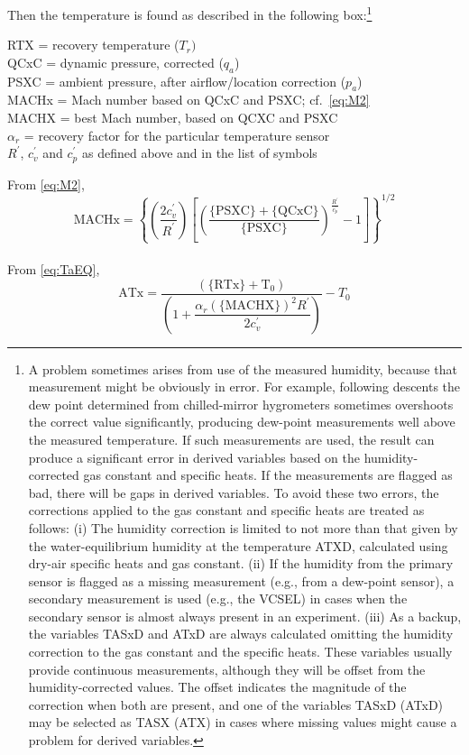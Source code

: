 \documentclass[
]{book}
\begin{document}
Then the temperature is found as described in the following box:\footnote{A problem sometimes arises from use of the measured humidity, because that measurement might be obviously in error. For example, following descents the dew point determined from chilled-mirror hygrometers sometimes overshoots the correct value significantly, producing dew-point measurements well above the measured temperature. If such measurements are used, the result can produce a significant error in derived variables based on the humidity-corrected gas constant and specific heats. If the measurements are flagged as bad, there will be gaps in derived variables. To avoid these two errors, the corrections applied to the gas constant and specific heats are treated as follows: (i) The humidity correction is limited to not more than that given by the water-equilibrium humidity at the temperature ATXD, calculated using dry-air specific heats and gas constant. (ii) If the humidity from the primary sensor is flagged as a missing measurement (e.g., from a dew-point sensor), a secondary measurement is used (e.g., the VCSEL) in cases when the secondary sensor is almost always present in an experiment. (iii) As a backup, the variables TASxD and ATxD are always calculated omitting the humidity correction to the gas constant and the specific heats. These variables usually provide continuous measurements, although they will be offset from the humidity-corrected values. The offset indicates the magnitude of the correction when both are present, and one of the variables TASxD (ATxD) may be selected as TASX (ATX) in cases where missing values might cause a problem for derived variables.}

RTX = recovery temperature (\(T_{r})\)\\
QCxC = dynamic pressure, corrected (\(q_{a}\))\\
PSXC = ambient pressure, after airflow/location correction
(\(p_{a}\))\\
MACHx = Mach number
based on QCxC and PSXC; cf.~\eqref{eq:M2}\\
MACHX = best Mach number, based on QCXC and PSXC\\
\(\alpha_{r}\) = recovery factor for the particular temperature sensor\\
\(R^{\prime}\), \(c_{v}^{\prime}\) and \(c_{p}^{\prime}\) as defined
above and in the list of symbols

From \eqref{eq:M2},
\begin{equation}
\mathrm{MACHx}=\left\{ \left(\frac{2c_{v}^{\prime}}{R^{\prime}}\right)\left[\left(\frac{\mathrm{\{PSXC\}+\{QCxC\}}}{\mathrm{\{PSXC\}}}\right)^{\frac{R^{\prime}}{c_{p}^{\prime}}}-1\right]\right\} ^{1/2}  
\label{eq:MachBox}
\end{equation}\\
From \eqref{eq:TaEQ},
\begin{equation}
\mathrm{ATx}=\frac{\mathrm{\left(\{RTx\}+T_{0}\right)}}{\left(1+\dfrac{\alpha_{r}\mathrm{(\{MACHX\})}^{2}R^{\prime}}{2c_{v}^{\prime}}\right)}-T_{0}
\label{eq:ATbox}
\end{equation}
\end{document}
